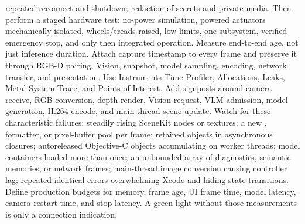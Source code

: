 repeated reconnect and shutdown;\markdownRendererOlItemEnd 
{}redaction of secrets and private media.\markdownRendererOlItemEnd 
\markdownRendererOlEnd \markdownRendererInterblockSeparator
{}Then perform a staged hardware test: no-power simulation, powered actuators mechanically isolated, wheels/treads raised, low limits, one subsystem, verified emergency stop, and only then integrated operation.\markdownRendererInterblockSeparator
{}
\markdownRendererSectionEnd \markdownRendererSectionBegin
{}\markdownRendererInterblockSeparator
{}Measure end-to-end age, not just inference duration. Attach capture timestamp to every frame and preserve it through RGB-D pairing, Vision, snapshot, model sampling, encoding, network transfer, and presentation.\markdownRendererParagraphSeparator
{}Use Instruments Time Profiler, Allocations, Leaks, Metal System Trace, and Points of Interest. Add signposts around camera receive, RGB conversion, depth render, Vision request, VLM admission, model generation, H.264 encode, and main-thread scene update.\markdownRendererParagraphSeparator
{}Watch for these characteristic failures:\markdownRendererInterblockSeparator
{}\markdownRendererUlBegin
\markdownRendererUlItem steadily rising SceneKit nodes or textures;\markdownRendererUlItemEnd 
\markdownRendererUlItem a new , formatter, or pixel-buffer pool per frame;\markdownRendererUlItemEnd 
\markdownRendererUlItem retained  objects in asynchronous closures;\markdownRendererUlItemEnd 
\markdownRendererUlItem autoreleased Objective-C objects accumulating on worker threads;\markdownRendererUlItemEnd 
\markdownRendererUlItem model containers loaded more than once;\markdownRendererUlItemEnd 
\markdownRendererUlItem an unbounded array of diagnostics, semantic memories, or network frames;\markdownRendererUlItemEnd 
\markdownRendererUlItem main-thread image conversion causing controller lag;\markdownRendererUlItemEnd 
\markdownRendererUlItem repeated identical errors overwhelming Xcode and hiding state transitions.\markdownRendererUlItemEnd 
\markdownRendererUlEnd \markdownRendererInterblockSeparator
{}Define production budgets for memory, frame age, UI frame time, model latency, camera restart time, and stop latency. A green light without those measurements is only a connection indication.\markdownRendererInterblockSeparator
{}
\markdownRendererSectionEnd \markdownRendererSectionBegin
{}\markdownRendererInterblockSeparator
